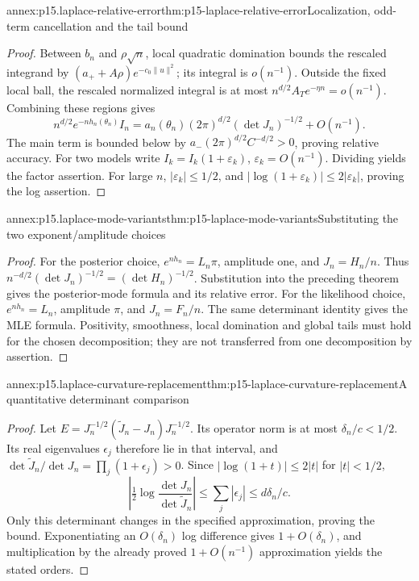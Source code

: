 \begin{annexitem}{annex:p15.laplace-relative-error}{thm:p15-laplace-relative-error}{Localization, odd-term cancellation and the tail bound}
\begin{proof}
Between \(b_n\) and \(\rho\sqrt n\), local quadratic domination bounds
the rescaled integrand by
\((a_++A\rho)e^{-c_0\|u\|^2}\); its integral is \(o(n^{-1})\).
Outside the fixed local ball, the rescaled normalized integral is at most
\(n^{d/2}A_Te^{-\eta n}=o(n^{-1})\). Combining these regions gives
\[
 n^{d/2}e^{-nh_n(\theta_n)}I_n
 =a_n(\theta_n)(2\pi)^{d/2}(\det J_n)^{-1/2}+O(n^{-1}).
\]
The main term is bounded below by
\(a_-(2\pi)^{d/2}C^{-d/2}>0\), proving relative accuracy.
For two models write \(I_k=\widehat I_k(1+\varepsilon_k)\),
\(\varepsilon_k=O(n^{-1})\). Dividing yields the factor assertion.
For large \(n\), \(|\varepsilon_k|\leq1/2\), and
\(|\log(1+\varepsilon_k)|\leq2|\varepsilon_k|\), proving the log assertion.
\end{proof}
\end{annexitem}

\begin{annexitem}{annex:p15.laplace-mode-variants}{thm:p15-laplace-mode-variants}{Substituting the two exponent/amplitude choices}
\begin{proof}
For the posterior choice, \(e^{nh_n}=L_n\pi\), amplitude one, and
\(J_n=H_n/n\). Thus
\(n^{-d/2}(\det J_n)^{-1/2}=(\det H_n)^{-1/2}\).
Substitution into the preceding theorem gives the posterior-mode formula
and its relative error. For the likelihood choice,
\(e^{nh_n}=L_n\), amplitude \(\pi\), and \(J_n=F_n/n\).
The same determinant identity gives the MLE formula. Positivity,
smoothness, local domination and global tails must hold for the chosen
decomposition; they are not transferred from one decomposition by assertion.
\end{proof}
\end{annexitem}

\begin{annexitem}{annex:p15.laplace-curvature-replacement}{thm:p15-laplace-curvature-replacement}{A quantitative determinant comparison}
\begin{proof}
Let \(E=J_n^{-1/2}(\widetilde J_n-J_n)J_n^{-1/2}\).
Its operator norm is at most \(\delta_n/c<1/2\). Its real eigenvalues
\(\epsilon_j\) therefore lie in that interval, and
\(\det\widetilde J_n/\det J_n=\prod_j(1+\epsilon_j)>0\).
Since \(|\log(1+t)|\leq2|t|\) for \(|t|<1/2\),
\[
 \left|\tfrac12\log\frac{\det J_n}{\det\widetilde J_n}\right|
 \leq\sum_j|\epsilon_j|\leq d\delta_n/c.
\]
Only this determinant changes in the specified approximation, proving the
bound. Exponentiating an \(O(\delta_n)\) log difference gives
\(1+O(\delta_n)\), and multiplication by the already proved
\(1+O(n^{-1})\) approximation yields the stated orders.
\end{proof}
\end{annexitem}

